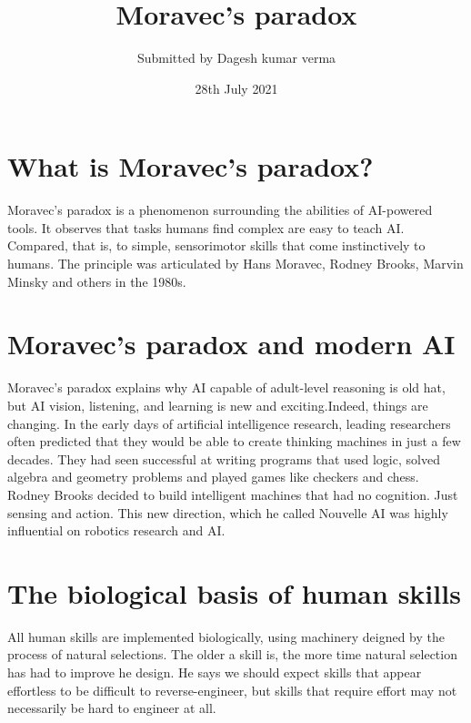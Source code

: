 \documentclass{article}
\title{Moravec’s paradox}
\author{Submitted by Dagesh kumar verma}
\date{28th July 2021}
\begin{document}
\maketitle

\section{What is Moravec’s paradox?}

Moravec’s paradox is a phenomenon surrounding the abilities of AI-powered tools. It observes that tasks humans find complex are easy to teach AI. Compared, that is, to simple, sensorimotor skills that come instinctively to humans. The principle was articulated by Hans Moravec, Rodney Brooks, Marvin Minsky and others in the 1980s. 

\section{Moravec’s paradox and modern AI}
Moravec’s paradox explains why AI capable of adult-level reasoning is old hat, but AI vision, listening, and learning is new and exciting.Indeed, things are changing.
In the early days of artificial intelligence research, leading researchers often predicted that they would be able to create thinking machines in just a few decades. They had seen successful at writing programs that used logic, solved algebra and geometry problems and played games like checkers and chess. Rodney Brooks decided to build intelligent machines that had no cognition. Just sensing and action. This new direction, which he called Nouvelle AI was highly influential on robotics research and AI.
\section{The biological basis of human skills}

All human skills are implemented biologically, using machinery deigned by the process of natural selections. The older a skill is, the more time natural selection has had to improve he design. He says we should expect skills that appear effortless to be difficult to reverse-engineer, but skills that require effort may not necessarily be hard to engineer at all.
\end{document}
